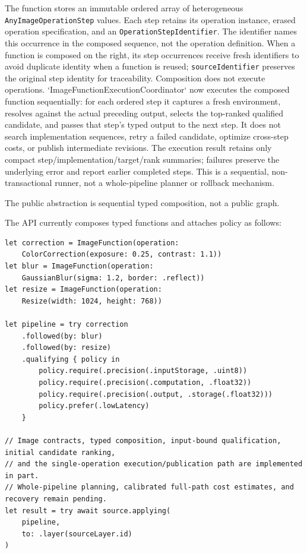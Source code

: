 \documentclass[11pt,a4paper,oneside]{article}
\begin{document}
The function stores an immutable ordered array of heterogeneous \texttt{AnyImageOperationStep} values. Each step retains its operation instance, erased operation specification, and an \texttt{OperationStepIdentifier}. The identifier names this occurrence in the composed sequence, not the operation definition. When a function is composed on the right, its step occurrences receive fresh identifiers to avoid duplicate identity when a function is reused; \texttt{sourceIdentifier} preserves the original step identity for traceability. Composition does not execute operations. `ImageFunctionExecutionCoordinator` now executes the composed function sequentially: for each ordered step it captures a fresh environment, resolves against the actual preceding output, selects the top-ranked qualified candidate, and passes that step's typed output to the next step. It does not search implementation sequences, retry a failed candidate, optimize cross-step costs, or publish intermediate revisions. The execution result retains only compact step/implementation/target/rank summaries; failures preserve the underlying error and report earlier completed steps. This is a sequential, non-transactional runner, not a whole-pipeline planner or rollback mechanism.

The public abstraction is sequential typed composition, not a public graph.

The API currently composes typed functions and attaches policy as follows:
\begin{lstlisting}
let correction = ImageFunction(operation:
    ColorCorrection(exposure: 0.25, contrast: 1.1))
let blur = ImageFunction(operation:
    GaussianBlur(sigma: 1.2, border: .reflect))
let resize = ImageFunction(operation:
    Resize(width: 1024, height: 768))

let pipeline = try correction
    .followed(by: blur)
    .followed(by: resize)
    .qualifying { policy in
        policy.require(.precision(.inputStorage, .uint8))
        policy.require(.precision(.computation, .float32))
        policy.require(.precision(.output, .storage(.float32)))
        policy.prefer(.lowLatency)
    }

// Image contracts, typed composition, input-bound qualification, initial candidate ranking,
// and the single-operation execution/publication path are implemented in part.
// Whole-pipeline planning, calibrated full-path cost estimates, and recovery remain pending.
let result = try await source.applying(
    pipeline,
    to: .layer(sourceLayer.id)
)
\end{lstlisting}
\end{document}

